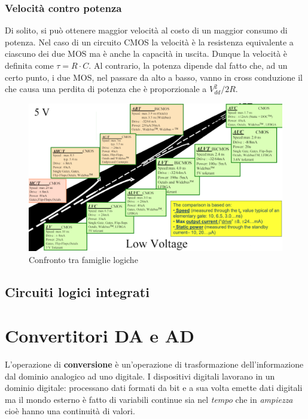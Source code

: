 \documentclass[12pt, a4paper]{report}
\begin{document}
\subsection{Velocità contro potenza}
Di solito, si può ottenere maggior velocità al costo di un maggior consumo di potenza. Nel caso di un circuito CMOS la velocità è la resistenza equivalente a ciascuno dei due MOS ma è anche la capacità in uscita. Dunque la velocità è definita come $\tau = R \cdot C$. Al contrario, la potenza dipende dal fatto che, ad un certo punto, i due MOS, nel passare da alto a basso, vanno in cross conduzione il che causa una perdita di potenza che è proporzionale a $V_{dd}^{2}/2R$.
\begin{figure}[h]
    \centering
    \includegraphics[scale=0.33,angle=0]{family_comparison.png}
    \caption{Confronto tra famiglie logiche}
\end{figure}

\section{Circuiti logici integrati}

\chapter{Convertitori DA e AD}
L'operazione di \textbf{conversione} è un'operazione di trasformazione dell'informazione dal dominio analogico ad uno digitale. I dispositivi digitali lavorano in un dominio digitale: processano dati formati da bit e a sua volta emette dati digitali ma il mondo esterno è fatto di variabili continue sia nel \textit{tempo} che in \textit{ampiezza} cioè hanno una continuità di valori.
\end{document}
